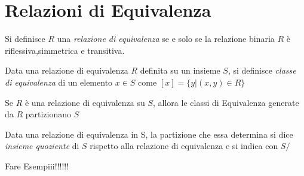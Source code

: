 \section{Relazioni di Equivalenza}
Si definisce $R$ una \emph{relazione di equivalenza} se e solo se la relazione binaria
$R$ è riflessiva,simmetrica e transitiva.


Data una relazione di equivalenza $R$ definita su un insieme $S$, si definisce
\emph{classe di equivalenza} di un elemento $x \in S$ come $[x] = \{y | (x,y) \in R \}$

\begin{thm}
Se $R$ è una relazione di equivalenza su $S$, allora le classi di Equivalenza
generate da $R$ partizionano $S$
\end{thm}

Data una relazione di equivalenza in S, la partizione che essa determina si dice
\emph{insieme quoziente} di $S$ rispetto alla relazione di equivalenza e si indica con $S/$

Fare Esempiii!!!!!!
